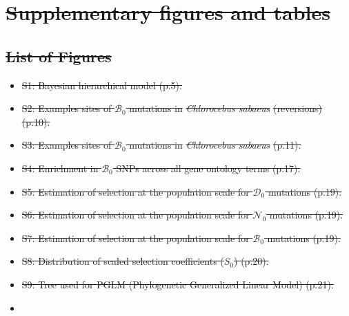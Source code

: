 \documentclass[10pt,letterpaper]{article}
\newcommand{\Sphy}{S_{0}}
\newcommand{\SphyDel}{\mathcal{D}_0}
\newcommand{\SphyNeu}{\mathcal{N}_0}
\newcommand{\SphyBen}{\mathcal{B}_0}
\providecommand{\DIFdeltex}[1]{{\protect\color{red}\sout{#1}}}                      %
\providecommand{\DIFdel}[1]{\texorpdfstring{\DIFdeltex{#1}}{}} %
\begin{document}
\section*{\DIFdel{Supplementary figures and tables}}
\subsection*{\DIFdel{List of Figures}}
\begin{itemize}%
\item%
\DIFdel{S1: Bayesian hierarchical model (p.5).
}%
\item%
\DIFdel{S2: Examples sites of $\SphyBen$ mutations in }\textit{\DIFdel{Chlorocebus sabaeus}} %
\DIFdel{(reversions) (p.10).
}%
\item%
\DIFdel{S3: Examples sites of $\SphyBen$ mutations in }\textit{\DIFdel{Chlorocebus sabaeus}} %
\DIFdel{(p.11).
}%
\item%
\DIFdel{S4: Enrichment in $\SphyBen$ SNPs across all gene ontology terms (p.17).
}%
\item%
\DIFdel{S5: Estimation of selection at the population scale for $\SphyDel$ mutations (p.19).
}%
\item%
\DIFdel{S6: Estimation of selection at the population scale for $\SphyNeu$ mutations (p.19).
}%
\item%
\DIFdel{S7: Estimation of selection at the population scale for $\SphyBen$ mutations (p.19).
}%
\item%
\DIFdel{S8: Distribution of scaled selection coefficients ($\Sphy$) (p.20).
}%
\item%
\DIFdel{S9: Tree used for PGLM (Phylogenetic Generalized Linear Model) (p.21).
}%
\item%

\end{itemize}
\end{document}
